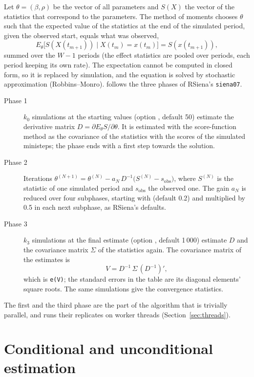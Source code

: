 Let $\theta=(\beta,\rho)$ be the vector of all parameters and $S(X)$ the vector of the statistics that correspond to the parameters. The method of moments chooses $\theta$ such that the expected value of the statistics at the end of the simulated period, given the observed start, equals what was observed,
\begin{equation}
  E_\theta\bigl[S(X(t_{m+1}))\mid X(t_m)=x(t_m)\bigr]=S(x(t_{m+1})) ,
  \label{eq:mom}
\end{equation}
summed over the $W-1$ periods (the effect statistics are pooled over periods, each period keeping its own rate). The expectation cannot be computed in closed form, so it is replaced by simulation, and the equation is solved by stochastic approximation (Robbins--Monro). \nwsaom{} follows the three phases of RSiena's \texttt{siena07}.
\begin{description}
  \item[Phase 1] $k_0$ simulations at the starting values (option , default 50) estimate the derivative matrix $D=\partial E_\theta S/\partial\theta$. It is estimated with the score-function method as the covariance of the statistics with the scores of the simulated ministeps; the phase ends with a first step towards the solution.
  \item[Phase 2] Iterations $\theta^{(N+1)}=\theta^{(N)}-a_N\,D^{-1}\bigl(S^{(N)}-s_{\mathrm{obs}}\bigr)$, where $S^{(N)}$ is the statistic of one simulated period and $s_{\mathrm{obs}}$ the observed one. The gain $a_N$ is reduced over four subphases, starting with  (default 0.2) and multiplied by 0.5 in each next subphase, as RSiena's defaults.
  \item[Phase 3] $k_3$ simulations at the final estimate (option , default 1\,000) estimate $D$ and the covariance matrix $\Sigma$ of the statistics again. The covariance matrix of the estimates is
  \begin{equation}
    V = D^{-1}\,\Sigma\,(D^{-1})' ,
  \end{equation}
  which is \texttt{e(V)}; the standard errors in the table are its diagonal elements' square roots. The same simulations give the convergence statistics.
\end{description}
The first and the third phase are the part of the algorithm that is trivially parallel, and \nwsaom{} runs their replicates on worker threads (Section~\ref{sec:threads}).

\section{Conditional and unconditional estimation}

